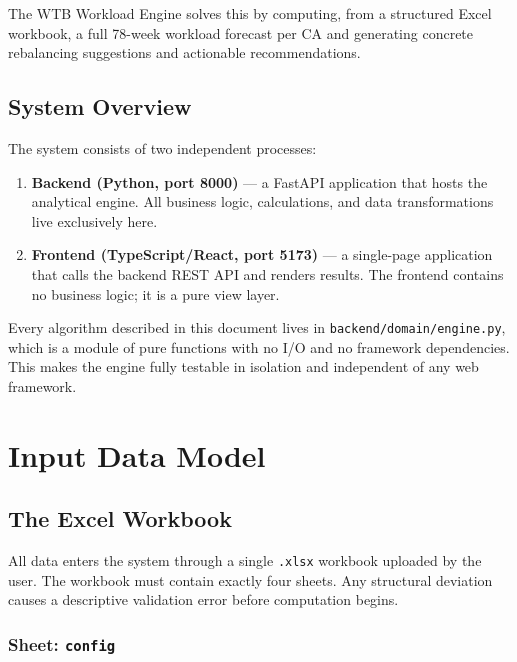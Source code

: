 \documentclass[12pt,a4paper]{report}
\begin{document}
The WTB Workload Engine solves this by computing, from a structured
Excel workbook, a full 78-week workload forecast per CA and generating
concrete rebalancing suggestions and actionable recommendations.

\section{System Overview}

The system consists of two independent processes:

\begin{enumerate}
  \item \textbf{Backend (Python, port 8000)} --- a FastAPI application
        that hosts the analytical engine. All business logic, calculations,
        and data transformations live exclusively here.
  \item \textbf{Frontend (TypeScript/React, port 5173)} --- a single-page
        application that calls the backend REST API and renders results.
        The frontend contains no business logic; it is a pure view layer.
\end{enumerate}

\begin{tcolorbox}[notebox, title={Design principle}]
  Every algorithm described in this document lives in
  \texttt{backend/domain/engine.py}, which is a module of pure functions
  with no I/O and no framework dependencies. This makes the engine fully
  testable in isolation and independent of any web framework.
\end{tcolorbox}

\chapter{Input Data Model}

\section{The Excel Workbook}

All data enters the system through a single \texttt{.xlsx} workbook
uploaded by the user. The workbook must contain exactly four sheets.
Any structural deviation causes a descriptive validation error before
computation begins.

\subsection{Sheet: \texttt{config}}
\end{document}
